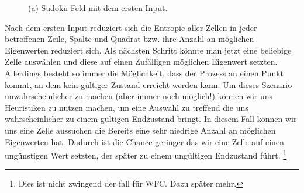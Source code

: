 \documentclass[12pt, a4paper,twoside,openright]{report}
\begin{document}
\begin{figure}[H]
    \centering
    \caption{(a) Sudoku Feld mit dem ersten Input.}%
\end{figure}

Nach dem ersten Input reduziert sich die Entropie aller Zellen in jeder betroffenen Zeile,
Spalte und Quadrat bzw. ihre Anzahl an möglichen Eigenwerten reduziert sich.
Als nächsten Schritt könnte man jetzt eine beliebige Zelle auswählen und diese auf einen Zufälligen möglichen Eigenwert setzten.
Allerdings besteht so immer die Möglichkeit, dass der Prozess an einen Punkt kommt, an dem kein gültiger Zustand erreicht werden kann.
Um dieses Szenario unwahrscheinlicher zu machen {(aber immer noch möglich!)} können wir uns Heuristiken zu nutzen machen,
um eine Auswahl zu treffend die uns wahrscheinlicher zu einem gültigen Endzustand bringt.
In diesem Fall können wir uns eine Zelle aussuchen die Bereits eine sehr niedrige Anzahl an möglichen Eigenwerten hat.
Dadurch ist die Chance geringer das wir eine Zelle auf einen ungünstigen Wert setzten, der später zu einem ungültigen Endzustand führt.
\footnote[2]{Dies ist nicht zwingend der fall für WFC. Dazu später mehr.}
\end{document}
